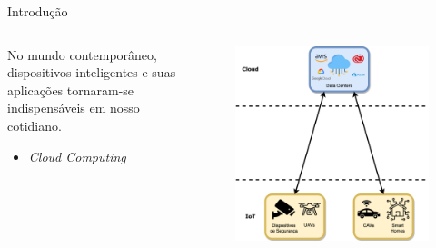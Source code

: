 
\begin{frame}{Introdução}
    \begin{columns}[T]
        \begin{column}{.5\textwidth}
            No mundo contemporâneo, dispositivos inteligentes e suas aplicações tornaram-se indispensáveis em nosso cotidiano.
            \begin{itemize}
                \item \textit{Cloud Computing}
            \end{itemize}
        \end{column}

        \begin{column}{.5\textwidth}
            \begin{figure}
                \centering
                \includegraphics[width=\textwidth]{Figuras/TCC Cloud IoT.png}
            \end{figure}
        \end{column}
    \end{columns}
\end{frame}

